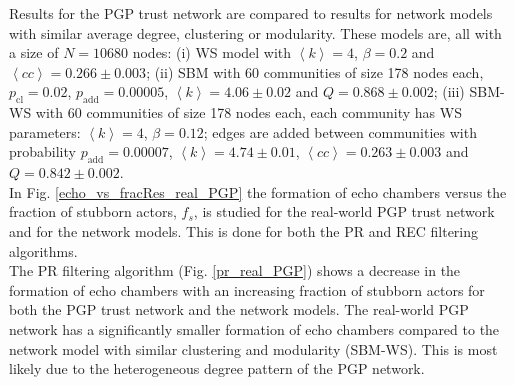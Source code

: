 \documentclass[11 pt , letterpaper , twoside , openright]{book}
\begin{document}
Results for the PGP trust network are compared to results for network models with similar average degree, clustering or modularity. These models are, all with a size of $N = 10680$ nodes: (i) WS model with $\left<k\right> = 4$, $\beta = 0.2$ and $\left<cc\right> = 0.266 \pm 0.003$; (ii) SBM with 60 communities of size 178 nodes each, $p_\text{cl} = 0.02$, $p_\text{add} = 0.00005$, $\left<k\right> = 4.06 \pm 0.02$ and $Q = 0.868 \pm 0.002$; (iii) SBM-WS with 60 communities of size 178 nodes each, each community has WS parameters: $\left<k\right> = 4$, $\beta = 0.12$; edges are added between communities with probability $p_\text{add} = 0.00007$, $\left<k\right> = 4.74 \pm 0.01$, $\left<cc\right> = 0.263 \pm 0.003$ and $Q = 0.842 \pm 0.002$.\\
\newline
In Fig. \ref{echo_vs_fracRes_real_PGP} the formation of echo chambers versus the fraction of stubborn actors, $f_s$, is studied for the real-world PGP trust network and for the network models. This is done for both the PR and REC filtering algorithms. \\
\newline
The PR filtering algorithm (Fig. \ref{pr_real_PGP}) shows a decrease in the formation of echo chambers with an increasing fraction of stubborn actors for both the PGP trust network and the network models. The real-world PGP network has a significantly smaller formation of echo chambers compared to the network model with similar clustering and modularity (SBM-WS). This is most likely due to the heterogeneous degree pattern of the PGP network. 
\end{document}
